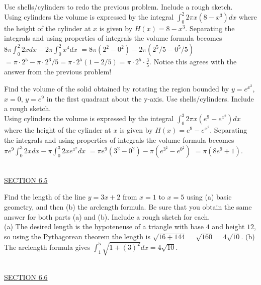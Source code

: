 \documentclass{exam}
\begin{document}
\begin{questions}
\question Use shells/cylinders to redo the previous problem.     Include a rough sketch.
\\ {\color{red} Using cylinders the volume is expressed by the integral $\displaystyle\int_0^2 2\pi x \left( 8 - x^3 \right)dx$ where the height of the cylinder at $x$ is given by $H(x) = 8 - x^3$.  Separating the integrals and using properties of integrals the volume formula becomes $8\pi  \displaystyle\int_0^2 2x dx  - 2\pi \displaystyle\int_0^2  x^4 dx$ $ = 8\pi  (2^2-0^2)  -2\pi (2^5/5 - 0^5/5)$ $ = \pi \cdot 2^5 - \pi\cdot 2^6/5  = \pi \cdot 2^5 \left( 1-2/5 \right) = \pi \cdot 2^5 \cdot \frac{3}{5}$.  Notice this agrees with the answer from the previous problem!}

\question Find the volume of the solid obtained by rotating the region bounded by $y=e^{x^2}$, $x=0$, $y = e^{9}$ in the first quadrant about the y-axis.  Use shells/cylinders.   Include a rough sketch.
\\ {\color{red} Using cylinders the volume is expressed by the integral $\displaystyle\int_0^3 2\pi x \left( e^9 - e^{x^2}\right)dx$ where the height of the cylinder at $x$ is given by $H(x) = e^9 - e^{x^2}$.  Separating the integrals and using properties of integrals the volume formula becomes $\pi e^9 \displaystyle\int_0^3 2x dx  -\pi \displaystyle\int_0^3  2x e^{x^2} dx$ $ = \pi e^9 (3^2-0^2)  -\pi (e^{3^2}-e^{0^2})$ $ = \pi (8e^9 + 1)$.}

\ \\
\underline{SECTION 6.5} 

\question Find the length of the line $y=3x+2$ from $x=1$ to $x=5$ using (a) basic geometry, and then (b) the arclength formula.  Be sure that you obtain the same answer for both parts (a) and (b).   Include a rough sketch for each.
\\ {\color{red} (a) The desired length is the hypoteneuse of a triangle with base $4$ and height $12$, so using the Pythagorean theorem the length is $\sqrt{16+144}=\sqrt{160} = 4\sqrt{10}$.  (b) The arclength formula gives $\displaystyle\int_1^5 \sqrt{1 + (3)^2}dx = 4\sqrt{10}$.  \checkmark }

\ \\
\underline{SECTION 6.6} 


\end{questions}
\end{document}

